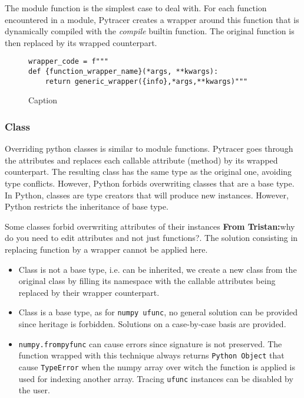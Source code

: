 \documentclass[acmconf,authordraft,anonymous,review]{acmart}
\newcommand{\tristan}[1]{\color{orange}\textbf{From Tristan:}#1\color{black}}
\begin{document}
The module function is the simplest case to deal with.
For each function encountered in a module, Pytracer
creates a wrapper around this function that is dynamically compiled with the \textit{compile}
builtin function. The original function is then replaced by its wrapped counterpart.

\begin{figure}
    \centering
\begin{lstlisting}
wrapper_code = f"""
def {function_wrapper_name}(*args, **kwargs):
    return generic_wrapper({info},*args,**kwargs)"""
\end{lstlisting}
    \caption{Caption}
    \label{fig:my_label}
\end{figure}

\subsubsection{Class}

Overriding python classes is similar to module functions.
Pytracer goes through the attributes and replaces each callable attribute (method) by its wrapped counterpart.
The resulting class has the same type as the original one, avoiding type conflicts.
However, Python forbids overwriting classes that are a base type. 
In Python, classes are type creators that will produce new instances.
However, Python restricts the inheritance of base type. 

    Some classes forbid overwriting attributes of their instances \tristan{why do you need to edit attributes and not just functions?}.
The solution consisting in replacing function by a wrapper cannot be applied here.
\begin{itemize}
    \item Class is not a base type, i.e. can be inherited, we create a new class from the original class by filling its namespace with the callable attributes being replaced by their wrapper counterpart.
    \item Class is a base type, as for \texttt{numpy ufunc}, no 
    general solution can be provided since heritage is forbidden.
    Solutions on a case-by-case basis are provided. 
    \item \texttt{numpy.frompyfunc} can cause errors since signature is not preserved. The function wrapped with this technique always returns \texttt{Python Object} that cause \texttt{TypeError} when the numpy array
    over witch the function is applied is used for indexing another array.
    Tracing \texttt{ufunc} instances can be disabled by the user.
\end{itemize}
\end{document}
